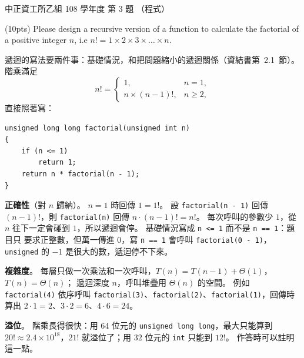 \begin{pastexam}[label={px:ccu-108-csb-02}]{中正資工所乙組 108 學年度 第 3 題}
（程式）

(10pts) Please design a recursive version of a function to calculate the factorial of a positive
integer $n$, i.e $n!=1\times2\times3\times\ldots\times n$.
\end{pastexam}

\begin{pastsoln}
遞迴的寫法要兩件事：基礎情況，和把問題縮小的遞迴關係（資結書第~2.1~節）。 階乘滿足
\[
n! = \begin{cases} 1, & n = 1, \\ n \times (n-1)!, & n \ge 2, \end{cases}
\]
直接照著寫：

\begin{verbatim}
unsigned long long factorial(unsigned int n)
{
    if (n <= 1)
        return 1;
    return n * factorial(n - 1);
}
\end{verbatim}

\textbf{正確性}（對 $n$ 歸納）。 $n = 1$ 時回傳 $1 = 1!$。 設 \texttt{factorial(n - 1)} 回傳
$(n-1)!$，則 \texttt{factorial(n)} 回傳 $n \cdot (n-1)! = n!$。 每次呼叫的參數少 $1$，從 $n$
往下一定會碰到 $1$，所以遞迴會停。 基礎情況寫成 \texttt{n <= 1} 而不是 \texttt{n == 1}：題目只
要求正整數，但萬一傳進 $0$，寫 \texttt{n == 1} 會呼叫 \texttt{factorial(0 - 1)}，
\texttt{unsigned} 的 $-1$ 是很大的數，遞迴停不下來。

\textbf{複雜度}。 每層只做一次乘法和一次呼叫，$T(n) = T(n-1) + \Theta(1)$，$T(n) = \Theta(n)$；
遞迴深度 $n$，呼叫堆疊用 $\Theta(n)$ 的空間。 例如 \texttt{factorial(4)} 依序呼叫
\texttt{factorial(3)}、\texttt{factorial(2)}、\texttt{factorial(1)}，回傳時算出
$2 \cdot 1 = 2$、$3 \cdot 2 = 6$、$4 \cdot 6 = 24$。

\textbf{溢位}。 階乘長得很快：用 $64$ 位元的 \texttt{unsigned long long}，最大只能算到
$20! \approx 2.4 \times 10^{18}$，$21!$ 就溢位了；用 $32$ 位元的 \texttt{int} 只能到 $12!$。
作答時可以註明這一點。
\end{pastsoln}
